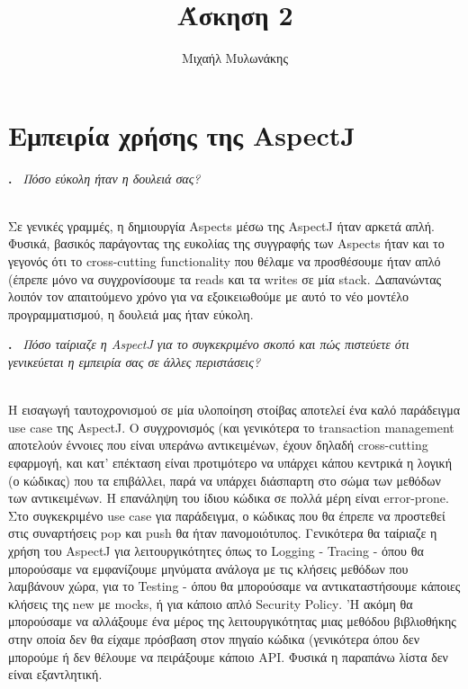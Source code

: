 \documentclass[12pt]{article}
\newcounter{problem}
\newcounter{solution}
\newcommand\Problem{%
  \stepcounter{problem}%
  \textbf{\theproblem.}~%
  \setcounter{solution}{0}%
}
\newcommand\TheSolution{%
  \textbf{}\\%
}
\begin{document}
\title{Άσκηση 2}
\author{Μιχαήλ Μυλωνάκης}
\maketitle

\section*{Εμπειρία χρήσης της \textlatin{AspectJ} }

\Problem \textit{Πόσο εύκολη ήταν η δουλειά σας?}

\TheSolution 
Σε γενικές γραμμές, η δημιουργία \textlatin{Aspects} μέσω της \textlatin{AspectJ} ήταν αρκετά απλή. Φυσικά, βασικός παράγοντας της
ευκολίας της συγγραφής των \textlatin{Aspects} ήταν και το γεγονός ότι το \textlatin{cross-cutting functionality} που θέλαμε να προσθέσουμε ήταν απλό
(έπρεπε μόνο να συγχρονίσουμε τα \textlatin{reads} και τα \textlatin{writes} σε μία \textlatin{stack}. Δαπανώντας λοιπόν τον απαιτούμενο 
χρόνο για να εξοικειωθούμε με αυτό το νέο μοντέλο προγραμματισμού, η δουλειά μας ήταν εύκολη.

\Problem \textit{Πόσο ταίριαζε η \textlatin{AspectJ} για το συγκεκριμένο σκοπό και πώς πιστεύετε ότι
γενικεύεται η εμπειρία σας σε άλλες περιστάσεις?}

\TheSolution 
Η εισαγωγή ταυτοχρονισμού σε μία υλοποίηση στοίβας αποτελεί ένα καλό παράδειγμα  \textlatin{use case} της \textlatin{AspectJ}. Ο συγχρονισμός (και γενικότερα το 
\textlatin{transaction management} αποτελούν έννοιες που είναι υπεράνω αντικειμένων, έχουν δηλαδή \textlatin{cross-cutting} εφαρμογή, και κατ' επέκταση είναι 
προτιμότερο να υπάρχει κάπου κεντρικά η λογική (ο κώδικας) που τα επιβάλλει, παρά να υπάρχει διάσπαρτη στο σώμα των μεθόδων των αντικειμένων. Η επανάληψη του ίδιου
κώδικα σε πολλά μέρη είναι \textlatin{error-prone}. Στο συγκεκριμένο \textlatin{use case} για παράδειγμα, ο κώδικας που θα έπρεπε να προστεθεί στις συναρτήσεις
\textlatin{pop} και \textlatin{push} θα ήταν πανομοιότυπος. Γενικότερα θα ταίριαζε η χρήση του \textlatin{AspectJ} για λειτουργικότητες όπως το 
\textlatin{Logging - Tracing} - όπου θα μπορούσαμε να εμφανίζουμε μηνύματα ανάλογα με τις κλήσεις μεθόδων που λαμβάνουν χώρα, για το \textlatin{Testing} - όπου θα
μπορούσαμε να αντικαταστήσουμε κάποιες κλήσεις της \textlatin{new} με \textlatin{mocks}, ή για κάποιο απλό \textlatin{Security Policy}. 'Η ακόμη θα μπορούσαμε να 
αλλάξουμε ένα μέρος της λειτουργικότητας μιας μεθόδου βιβλιοθήκης στην οποία δεν θα είχαμε πρόσβαση στον πηγαίο κώδικα (γενικότερα όπου δεν μπορούμε ή δεν
θέλουμε να πειράξουμε κάποιο \textlatin{API}. Φυσικά η παραπάνω λίστα δεν είναι εξαντλητική.
\end{document}
